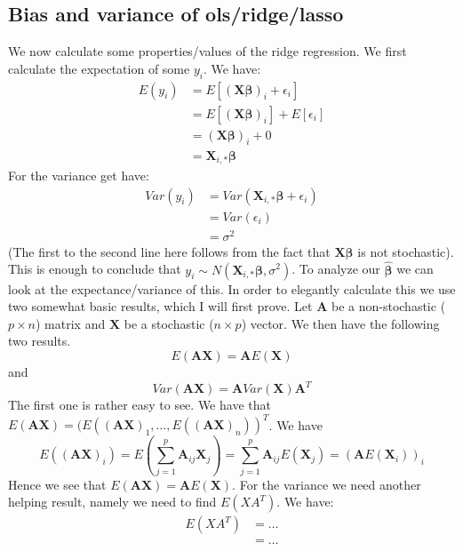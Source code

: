 \documentclass{article}
\begin{document}
\subsection{Bias and variance of ols/ridge/lasso}
We now calculate some properties/values of the ridge regression. We first
calculate the expectation of some $y_i$. We have:
\begin{align*}
    E(y_i) & = E\left[ (\mathbf{X}\mathbf{\beta})_i + \epsilon_i \right]                 \\
           & = E\left[ (\mathbf{X}\mathbf{\beta})_i \right] + E\left[ \epsilon_i \right] \\
           & = (\mathbf{X}\mathbf{\beta})_i + 0                                          \\
           & = \mathbf{X}_{i, *}\mathbf{\beta}
\end{align*}
For the variance get have:
\begin{align*}
    Var(y_i) & = Var(\mathbf{X}_{i, *} \mathbf{\beta} + \epsilon_i) \\
             & = Var(\epsilon_i)                                    \\
             & = \sigma^2
\end{align*}
(The first to the second line here follows from the fact that $\mathbf{X} \mathbf{\beta}$ is not stochastic).
This is enough to conclude that $y_i \sim N(\mathbf{X}_{i, *} \mathbf{\beta},
    \sigma^2)$.  To analyze our $\mathbf{\hat{\beta}}$ we can look at the
expectance/variance of this. In order to elegantly calculate this we use two
somewhat basic results, which I will first prove. Let $\mathbf{A}$ be a
non-stochastic ($p\times n$) matrix and $\mathbf{X}$ be a stochastic ($n \times
    p$) vector. We then have the following two results.
$$E(\mathbf{A} \mathbf{X}) = \mathbf{A} E(\mathbf{X})$$
and
$$Var(\mathbf{A} \mathbf{X}) = \mathbf{A} Var(\mathbf{X}) \mathbf{A}^T$$
The first one is rather easy to see. We have that $E(\mathbf{A} \mathbf{X}) =
    (E((\mathbf{A} \mathbf{X})_1, \dots, E((\mathbf{A} \mathbf{X})_n))^T$. We have
$$E((\mathbf{A} \mathbf{X})_i) = E(\sum_{j=1}^{p} \mathbf{A}_{i j} \mathbf{X}_j) = \sum_{j=1}^{p} \mathbf{A}_{i j} E(\mathbf{X}_j) = (\mathbf{A} E(\mathbf{X}_i))_i$$
Hence we see that $E(\mathbf{A}\mathbf{X}) = \mathbf{A} E(\mathbf{X})$. For the variance we need another helping result, namely we need to find $E(X A^T)$. We have:
\begin{align*}
    E(X A^T) & = \dots \\
             & = \dots
\end{align*}
\end{document}
